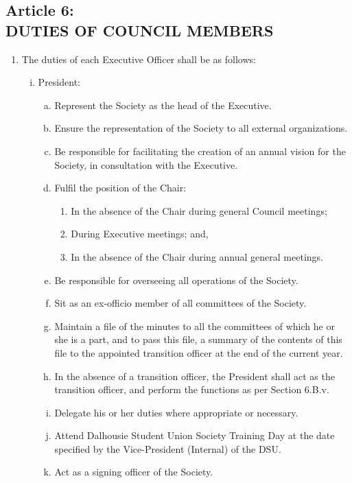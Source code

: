 \documentclass[]{report}
\begin{document}
\clearpage
\begin{center}
	\section*{Article 6:\\DUTIES OF COUNCIL MEMBERS}
	\vspace{12px}
\end{center}
\label{dutiesCouncilMembers}

	\renewcommand{\theenumi}{\Alph{enumi}}
	\begin{enumerate}
		\item The duties of each Executive Officer shall be as follows:\\
	
		\begin{enumerate}[i.]
			\item President:
			
			\begin{enumerate}[(a)]
				\item Represent the Society as the head of the Executive.
				\item Ensure the representation of the Society to all external organizations.
				\item Be responsible for facilitating the creation of an annual vision for the Society, in consultation with the Executive.
				\item Fulfil the position of the Chair:
					\begin{enumerate}[(1)]
						\item In the absence of the Chair during general Council meetings;
						\item During Executive meetings; and,
						\item In the absence of the Chair during annual general meetings.
					\end{enumerate}
				\item Be responsible for overseeing all operations of the Society.
				\item Sit as an ex-officio member of all committees of the Society.
				\item Maintain a file of the minutes to all the committees of which he or she is a part, and to pass this file, a summary of the contents of this file to the appointed transition officer at the end of the current year.
				\item In the absence of a transition officer, the President shall act as the transition officer, and perform the functions as per Section 6.B.v.
				\item Delegate his or her duties where appropriate or necessary.
				\item Attend Dalhousie Student Union Society Training Day at the date specified by the Vice-President (Internal) of the DSU.
				\item Act as a signing officer of the Society.
			\end{enumerate}
		

\end{enumerate}
\end{enumerate}
\end{document}

